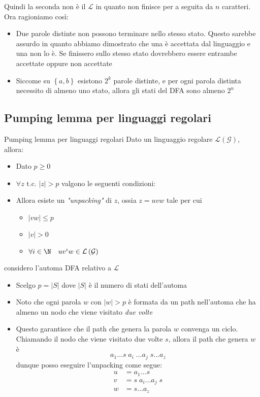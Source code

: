 Quindi la seconda non è il $ \mathcal{L} $ in quanto non finisce per a seguita da $ n $ caratteri. Ora ragioniamo così:
\begin{itemize}
	\item Due parole distinte non possono terminare nello stesso stato. Questo sarebbe assurdo in quanto abbiamo dimostrato che una è accettata dal linguaggio e una non lo è. Se finissero sullo stesso stato dovrebbero essere entrambe accettate oppure non accettate
	\item Siccome su $ \left\{a, b\right\} $ esistono $ 2^{k} $ parole distinte, e per ogni parola distinta necessito di almeno uno stato, allora gli stati del DFA sono almeno $ 2^{n} $
\end{itemize}
\subsection{Pumping lemma per linguaggi regolari}
\begin{teorema}{Pumping lemma per linguaggi regolari}
	Dato un linguaggio regolare $ \mathcal{L}\left(\mathcal{G}\right) $, allora:
	\begin{itemize}
		\item Dato $ p \ge 0 $
		\item $ \forall z \text{ t.c. } \left|z\right| > p $ valgono le seguenti condizioni:
		\item Allora esiste un \textit{"unpacking"} di $ z $, ossia $ z = uvw $ tale per cui
		      \begin{itemize}
			      \item $ \left|vw\right| \le p $
			      \item $ \left|v\right| > 0$
			      \item $ \forall i \in \N \quad u v^{i} w  \in \mathcal{L}\left(\mathcal{G}\right) $
		      \end{itemize}
	\end{itemize}
\end{teorema}
 considero l'automa DFA relativo a $ \mathcal{L} $
\begin{itemize}
	\item Scelgo $ p = \left|S\right|$ dove $ \left|S\right| $ è il numero di stati dell'automa
	\item Noto che ogni parola $ w $ con $ \left|w\right| > p $ è formata da un path nell'automa che ha almeno un nodo che viene visitato \textit{due volte}
	\item Questo garantisce che il path che genera la parola $ w $ convenga un ciclo. Chiamando il nodo che viene visitato due volte $ s $, allora il path che genera $ w $ è
	      \[
		      a_1 \ldots s\; a_i\; \ldots  a_{j}\; s \ldots a_z
	      \]
	      dunque posso eseguire l'unpacking come segue:
	      \begin{align*}
		      u & = a_1 \ldots s           \\
		      v & = s\; a_i \ldots a_j\; s \\
		      w & = s \ldots a_z           \\
	      \end{align*}
\end{itemize}
